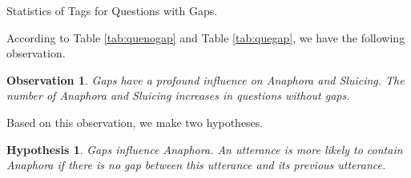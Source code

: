 \documentclass[bsc,frontabs,twoside,singlespacing,parskip,deptreport]{infthesis}     %
\newtheorem{observation}{Observation}[chapter]
\newtheorem{hypo}{Hypothesis}[chapter]
\begin{document}
\begin{minipage}{\textwidth}
\begin{minipage}[t]{0.45\textwidth}
\caption{Statistics of Tags for Questions with Gaps.}
\label{tab:quegap}


        \end{minipage}
    \end{minipage}


According to Table \ref{tab:quenogap} and Table \ref{tab:quegap}, we have the following observation.

\begin{observation}
Gaps have a profound influence on Anaphora and Sluicing. The number of Anaphora and Sluicing increases in questions without gaps.
\end{observation}

Based on this observation, we make two hypotheses.

\begin{hypo}
Gaps influence Anaphora. An utterance is more likely to contain Anaphora if there is no gap between this utterance and its previous utterance.
\end{hypo}
\end{document}
